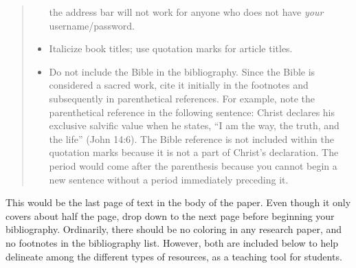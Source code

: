 \documentclass[raggedright]{turabian-researchpaper}
\begin{document}
\begin{quotation}
\begin{itemize}
  the address bar will not work for anyone who does not have \emph{your}
  username/password.
\item Italicize book titles; use quotation marks for article titles.
\item Do not include the Bible in the bibliography. Since the Bible is
  considered a sacred work, cite it initially in the footnotes and subsequently
  in parenthetical references. For example, note the parenthetical reference in
  the following sentence: Christ declares his exclusive salvific value when he
  states, ``I am the way, the truth, and the life'' (John 14:6). The Bible
  reference is not included within the quotation marks because it is not a part
  of Christ's declaration. The period would come after the parenthesis because
  you cannot begin a new sentence without a period immediately preceding it.
\end{itemize}
\end{quotation}

This would be the last page of text in the body of the paper. Even though it
only covers about half the page, drop down to the next page before beginning
your bibliography. Ordinarily, there should be no coloring in any research
paper, and no footnotes in the bibliography list. However, both are included
below to help delineate among the different types of resources, as a teaching
tool for students.

\clearpage
\printbibliography
\end{document}
